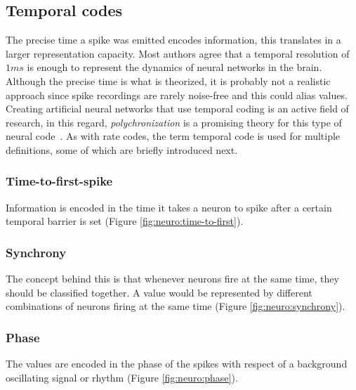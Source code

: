 \subsection{Temporal codes}
The precise time a spike was emitted encodes information, this translates in a larger representation capacity. Most authors agree that a temporal resolution of $1ms$ is enough to represent the dynamics of neural networks in the brain. Although the precise time is what is theorized, it is probably not a realistic approach since spike recordings are rarely noise-free and this could alias values. Creating artificial neural networks that use temporal coding is an active field of research, in this regard, \emph{polychronization} is a promising theory for this type of neural code~\cite{polychronization-Izhikevich2005}. As with rate codes, the term temporal code is used for multiple definitions, some of which are briefly introduced next.

\subsubsection{Time-to-first-spike}
Information is encoded in the time it takes a neuron to spike after a certain temporal barrier is set (Figure \ref{fig:neuro:time-to-first}).

\subsubsection{Synchrony}
The concept behind this is that whenever neurons fire at the same time, they should be classified together. A value would be represented by different combinations of neurons firing at the same time (Figure \ref{fig:neuro:synchrony}).

\subsubsection{Phase}
The values are encoded in the phase of the spikes with respect of a background oscillating signal or rhythm (Figure \ref{fig:neuro:phase}).

